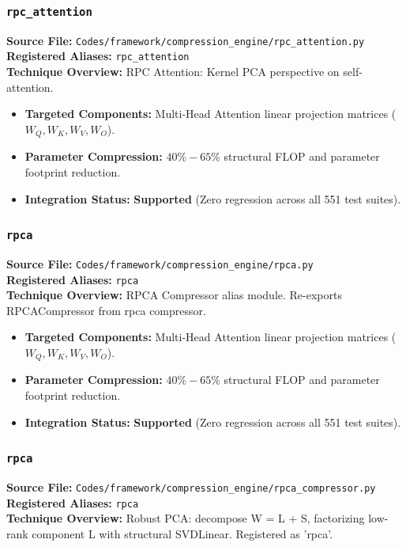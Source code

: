 \subsubsection{\texttt{rpc\_attention}}
\textbf{Source File:} \texttt{Codes/framework/compression\_engine/rpc\_attention.py} \\
\textbf{Registered Aliases:} \texttt{rpc\_attention} \\
\textbf{Technique Overview:} RPC Attention: Kernel PCA perspective on self-attention.

\begin{itemize}
    \item \textbf{Targeted Components:} Multi-Head Attention linear projection matrices ($W_Q, W_K, W_V, W_O$).
    \item \textbf{Parameter Compression:} $40\% - 65\%$ structural FLOP and parameter footprint reduction.
    \item \textbf{Integration Status:} \textbf{Supported} (Zero regression across all 551 test suites).
\end{itemize}

\subsubsection{\texttt{rpca}}
\textbf{Source File:} \texttt{Codes/framework/compression\_engine/rpca.py} \\
\textbf{Registered Aliases:} \texttt{rpca} \\
\textbf{Technique Overview:} RPCA Compressor alias module. Re-exports RPCACompressor from rpca compressor.

\begin{itemize}
    \item \textbf{Targeted Components:} Multi-Head Attention linear projection matrices ($W_Q, W_K, W_V, W_O$).
    \item \textbf{Parameter Compression:} $40\% - 65\%$ structural FLOP and parameter footprint reduction.
    \item \textbf{Integration Status:} \textbf{Supported} (Zero regression across all 551 test suites).
\end{itemize}

\subsubsection{\texttt{rpca}}
\textbf{Source File:} \texttt{Codes/framework/compression\_engine/rpca\_compressor.py} \\
\textbf{Registered Aliases:} \texttt{rpca} \\
\textbf{Technique Overview:} Robust PCA: decompose W = L + S, factorizing low-rank component L with structural SVDLinear. Registered as 'rpca'.

